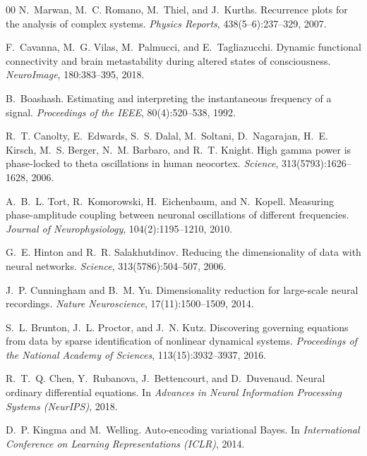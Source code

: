 \documentclass[5p,twocolumn,authoryear]{elsarticle}
\begin{document}
\begin{thebibliography}{00}
N.~Marwan, M.~C. Romano, M.~Thiel, and J.~Kurths.
\newblock Recurrence plots for the analysis of complex systems.
\newblock \emph{Physics Reports}, 438(5--6):237--329, 2007.

F.~Cavanna, M.~G. Vilas, M.~Palmucci, and E.~Tagliazucchi.
\newblock Dynamic functional connectivity and brain metastability during altered states of consciousness.
\newblock \emph{NeuroImage}, 180:383--395, 2018.

B.~Boashash.
\newblock Estimating and interpreting the instantaneous frequency of a signal.
\newblock \emph{Proceedings of the IEEE}, 80(4):520--538, 1992.

R.~T. Canolty, E.~Edwards, S.~S. Dalal, M.~Soltani, D.~Nagarajan, H.~E. Kirsch, M.~S. Berger, N.~M. Barbaro, and R.~T. Knight.
\newblock High gamma power is phase-locked to theta oscillations in human neocortex.
\newblock \emph{Science}, 313(5793):1626--1628, 2006.

A.~B.~L. Tort, R.~Komorowski, H.~Eichenbaum, and N.~Kopell.
\newblock Measuring phase-amplitude coupling between neuronal oscillations of different frequencies.
\newblock \emph{Journal of Neurophysiology}, 104(2):1195--1210, 2010.

G.~E. Hinton and R.~R. Salakhutdinov.
\newblock Reducing the dimensionality of data with neural networks.
\newblock \emph{Science}, 313(5786):504--507, 2006.

J.~P. Cunningham and B.~M. Yu.
\newblock Dimensionality reduction for large-scale neural recordings.
\newblock \emph{Nature Neuroscience}, 17(11):1500--1509, 2014.

S.~L. Brunton, J.~L. Proctor, and J.~N. Kutz.
\newblock Discovering governing equations from data by sparse identification of nonlinear dynamical systems.
\newblock \emph{Proceedings of the National Academy of Sciences}, 113(15):3932--3937, 2016.

R.~T.~Q. Chen, Y.~Rubanova, J.~Bettencourt, and D.~Duvenaud.
\newblock Neural ordinary differential equations.
\newblock In \emph{Advances in Neural Information Processing Systems (NeurIPS)}, 2018.

D.~P. Kingma and M.~Welling.
\newblock Auto-encoding variational Bayes.
\newblock In \emph{International Conference on Learning Representations (ICLR)}, 2014.


\end{thebibliography}
\end{document}
